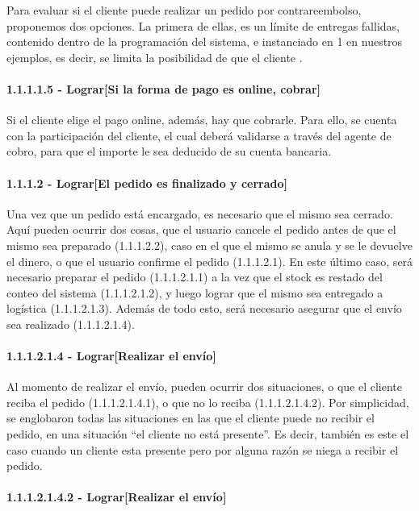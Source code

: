 Para evaluar si el cliente puede realizar un pedido por contrareembolso,
proponemos dos opciones. La primera de ellas, es un límite de entregas fallidas,
contenido dentro de la programación del sistema, e instanciado en 1 en nuestros
ejemplos, es decir, se limita la posibilidad de que el cliente .


\paragraph{1.1.1.1.5 - Lograr[Si la forma de pago es online, cobrar]}

Si el cliente elige el pago online, además, hay que cobrarle. Para ello, se
cuenta con la participación del cliente, el cual deberá validarse a través del
agente de cobro, para que el importe le sea deducido de su cuenta bancaria.

\paragraph{1.1.1.2 - Lograr[El pedido es finalizado y cerrado]}

Una vez que un pedido está encargado, es necesario que el mismo sea cerrado.
Aquí pueden ocurrir dos cosas, que el usuario cancele el pedido antes de que el
mismo sea preparado (1.1.1.2.2), caso en el que el mismo se anula y se le
devuelve el dinero, o que el usuario confirme el pedido (1.1.1.2.1). En este
último caso, será necesario preparar el pedido (1.1.1.2.1.1) a la vez que el
stock es restado del conteo del sistema (1.1.1.2.1.2), y luego lograr que el
mismo sea entregado a logística (1.1.1.2.1.3). Además de todo esto, será
necesario asegurar que el envío sea realizado (1.1.1.2.1.4).

\paragraph{1.1.1.2.1.4 - Lograr[Realizar el envío]}

Al momento de realizar el envío, pueden ocurrir dos situaciones, o que el
cliente reciba el pedido (1.1.1.2.1.4.1), o que no lo reciba (1.1.1.2.1.4.2).
Por simplicidad, se englobaron todas las situaciones en las que el cliente puede
no recibir el pedido, en una situación ``el cliente no está presente''. Es
decir, también es este el caso cuando un cliente esta presente pero por alguna
razón se niega a recibir el pedido.

\paragraph{1.1.1.2.1.4.2 - Lograr[Realizar el envío]}

